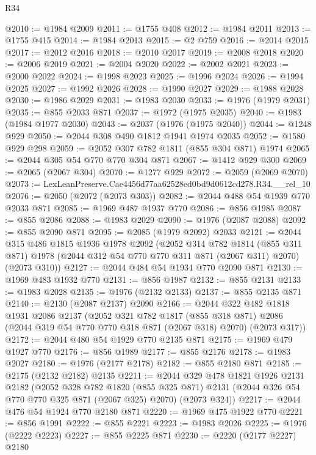 \begin{lexlean}{R34}
\begin{coremodule}
@2010 := @1984 @2009
@2011 := @1755 @408
@2012 := @1984 @2011
@2013 := @1755 @415
@2014 := @1984 @2013
@2015 := @2 @759
@2016 := @2014 @2015
@2017 := @2012 @2016
@2018 := @2010 @2017
@2019 := @2008 @2018
@2020 := @2006 @2019
@2021 := @2004 @2020
@2022 := @2002 @2021
@2023 := @2000 @2022
@2024 := @1998 @2023
@2025 := @1996 @2024
@2026 := @1994 @2025
@2027 := @1992 @2026
@2028 := @1990 @2027
@2029 := @1988 @2028
@2030 := @1986 @2029
@2031 := @1983 @2030
@2033 := @1976 (@1979 @2031)
@2035 := @855 @2033 @871
@2037 := @1972 (@1975 @2035)
@2040 := @1983 (@1984 @1977 @2030)
@2043 := @2037 (@1976 (@1975 @2040))
@2044 := @1248 @929
@2050 := @2044 @308 @490 @1812 @1941 @1974 @2035
@2052 := @1580 @929 @298
@2059 := @2052 @307 @782 @1811 (@855 @304 @871) @1974
@2065 := @2044 @305 @54 @770 @770 @304 @871
@2067 := @1412 @929 @300
@2069 := @2065 (@2067 @304)
@2070 := @1277 @929
@2072 := @2059 (@2069 @2070)
@2073 := LexLeanPreserve.Cae4456d77aa62528ed0bd9d0612cd278.R34.__rel_10
@2076 := @2050 (@2072 (@2073 @303))
@2082 := @2044 @488 @54 @1939 @770 @2033 @871
@2085 := @1969 @487 @1937 @770
@2086 := @856 @1985
@2087 := @855 @2086
@2088 := @1983 @2029
@2090 := @1976 (@2087 @2088)
@2092 := @855 @2090 @871
@2095 := @2085 (@1979 @2092) @2033
@2121 := @2044
    @315
    @486
    @1815
    @1936
    @1978
    @2092
    (@2052
      @314
      @782
      @1814
      (@855 @311 @871)
      @1978
      (@2044 @312 @54 @770 @770 @311 @871 (@2067 @311) @2070)
      (@2073 @310))
@2127 := @2044 @484 @54 @1934 @770 @2090 @871
@2130 := @1969 @483 @1932 @770
@2131 := @856 @1987
@2132 := @855 @2131
@2133 := @1983 @2028
@2135 := @1976 (@2132 @2133)
@2137 := @855 @2135 @871
@2140 := @2130 (@2087 @2137) @2090
@2166 := @2044
    @322
    @482
    @1818
    @1931
    @2086
    @2137
    (@2052
      @321
      @782
      @1817
      (@855 @318 @871)
      @2086
      (@2044 @319 @54 @770 @770 @318 @871 (@2067 @318) @2070)
      (@2073 @317))
@2172 := @2044 @480 @54 @1929 @770 @2135 @871
@2175 := @1969 @479 @1927 @770
@2176 := @856 @1989
@2177 := @855 @2176
@2178 := @1983 @2027
@2180 := @1976 (@2177 @2178)
@2182 := @855 @2180 @871
@2185 := @2175 (@2132 @2182) @2135
@2211 := @2044
    @329
    @478
    @1821
    @1926
    @2131
    @2182
    (@2052
      @328
      @782
      @1820
      (@855 @325 @871)
      @2131
      (@2044 @326 @54 @770 @770 @325 @871 (@2067 @325) @2070)
      (@2073 @324))
@2217 := @2044 @476 @54 @1924 @770 @2180 @871
@2220 := @1969 @475 @1922 @770
@2221 := @856 @1991
@2222 := @855 @2221
@2223 := @1983 @2026
@2225 := @1976 (@2222 @2223)
@2227 := @855 @2225 @871
@2230 := @2220 (@2177 @2227) @2180

\end{coremodule}
\end{lexlean}
